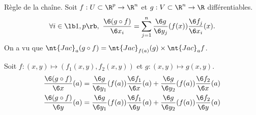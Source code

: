 \documentclass[11pt]{article}
\newcommand*{\Jac}{\nt{Jac}}
\begin{document}
\begin{prop}{Règle de la chaîne.}{}
    Soit $f:U\subset\R^p\to\R^n$ et $g:V\subset\R^n\to\R$ différentiables.
    \begin{equation*}
        \forall i \in \lb1,p\rb, ~ \frac{\6(g\circ f)}{\6 x_i} = \sum_{j=1}^n \frac{\6 g}{\6 y_j}(f(x))\frac{\6 f_j}{\6 x_i}(x).
    \end{equation*}
    \tcblower
    On a vu que $\Jac_a(g\circ f) = \Jac_{f(a)}(g)\times \Jac_a f$.
\end{prop}

\begin{ex}{}{}
    Soit $f:(x,y)\mapsto(f_1(x,y), f_2(x,y))$ et $g:(x,y)\mapsto g(x,y)$.
    \begin{align*}
            &\frac{\6 (g\circ f)}{\6 x}(a) = \frac{\6 g}{\6 y_1}(f(a))\frac{\6 f_1}{\6 x}(a) + \frac{\6 g}{\6 y_2}(f(a))\frac{\6 f_2}{\6 x}(a)\\
            &\frac{\6 (g\circ f)}{\6 y}(a) = \frac{\6 g}{\6 y_1}(f(a))\frac{\6 f_1}{\6 y}(a) + \frac{\6 g}{\6 y_2}(f(a))\frac{\6 f_2}{\6 y}(a)
    \end{align*}
\end{ex}
\end{document}

